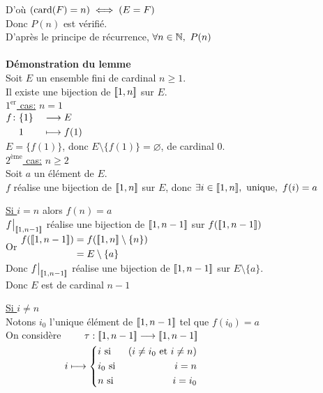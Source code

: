 \documentclass[12pt,twoside,a4paper]{article}
\begin{document}
\begin{preuve}
		D'où $(\text{card}(F)=n)\iff(E=F)$\\
		Donc $P(n)$ est vérifié.\\
		D'après le principe de récurrence, $\forall n\in\mathbb{N},\ P(n)$\\
		\\
		\textbf{Démonstration du lemme}\\
		Soit $E$ un ensemble fini de cardinal $n\geqslant 1$.\\
		Il existe une bijection de $[\![ 1,n]\!]$ sur $E$.\\
		\underline{$1^{\text{er}}$ cas:} $n=1$\\
		$\begin{aligned}[t]f\colon&\{1\}&&\longrightarrow E \\&1&&\longmapsto f(1)\end{aligned}$\\
		$E=\{f(1)\}$, donc $E\setminus \{f(1)\}=\varnothing$, de cardinal $0$.\\
		\underline{$2^{\text{ème}}$ cas:} $n\geqslant 2$\\
		Soit $a$ un élément de $E$.\\
		$f$ réalise une bijection de $[\![ 1,n]\!]$ sur $E$, donc $\exists i\in \lbracket 1,n\rbracket,\ \text{unique},\ f(i)=a$
		\begin{liste}
			\item \underline{Si $i=n$} alors $f(n)=a$\\
				$\restr{f}{\lbracket 1,n-1\rbracket}$ réalise une bijection de $[\![ 1,n-1]\!]$ sur $f([\![ 1,n-1]\!])$\\
				Or $\begin{aligned}
				f([\![ 1,n-1]\!])&=f([\![ 1,n]\!]\setminus\{n\})\\
					&=E\setminus \{a\}
				\end{aligned}$\\
				Donc $\restr{f}{\lbracket 1,n-1\rbracket}$ réalise une bijection de $[\![ 1,n-1]\!]$ sur $E\setminus \{a\}$.\\
				Donc $E$ est de cardinal $n-1$
			\item \underline{Si $i\neq n$}\\
				Notons $i_0$ l'unique élément de $[\![ 1,n-1]\!]$ tel que $f(i_0)=a$\\
				On considère 
				$\begin{aligned}[t]
				\tau:[\![ 1,n-1]\!] \longrightarrow [\![ 1,n-1]\!]\\
					i \longmapsto 
					\left\{\begin{aligned}
					& i \text{ si }&(i\neq i_0\text{ et } i\neq n)\\
					& i_0 \text{ si }& i=n\\
					& n \text{ si }& i=i_0
					\end{aligned}\right.
				\end{aligned}$
		\end{liste}
	\end{preuve}
\end{document}

